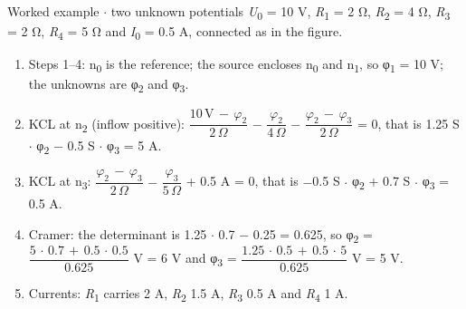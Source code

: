 \documentclass[11pt]{article}
\begin{document}
\begin{keepsection}
\begin{keepsection}
\begin{center}
\begin{minipage}[t]{0.950\linewidth}
\par{}\end{minipage}
\end{center}

\begin{workedbox}{Worked example \ensuremath{\cdot} two unknown potentials}
\textit{U}\textsubscript{0} = 10 V, \textit{R}\textsubscript{1} = 2 Ω, \textit{R}\textsubscript{2} = 4 Ω, \textit{R}\textsubscript{3} = 2 Ω, \textit{R}\textsubscript{4} = 5 Ω and \textit{I}\textsubscript{0} = 0.5 A, connected as in the figure.

\begin{enumerate}
\item Steps 1–4: n\textsubscript{0} is the reference; the source encloses n\textsubscript{0} and n\textsubscript{1}, so φ\textsubscript{1} = 10 V; the unknowns are φ\textsubscript{2} and φ\textsubscript{3}.
\item KCL at n\textsubscript{2} (inflow positive): {\small\ensuremath{\dfrac{10\, \mathrm{V}\, -\, φ_{2}}{2\, Ω}}} \ensuremath{-} {\small\ensuremath{\dfrac{φ_{2}}{4\, Ω}}} \ensuremath{-} {\small\ensuremath{\dfrac{φ_{2}\, -\, φ_{3}}{2\, Ω}}} = 0, that is 1.25 S \ensuremath{\cdot} φ\textsubscript{2} \ensuremath{-} 0.5 S \ensuremath{\cdot} φ\textsubscript{3} = 5 A.
\item KCL at n\textsubscript{3}: {\small\ensuremath{\dfrac{φ_{2}\, -\, φ_{3}}{2\, Ω}}} \ensuremath{-} {\small\ensuremath{\dfrac{φ_{3}}{5\, Ω}}} + 0.5 A = 0, that is \ensuremath{-}0.5 S \ensuremath{\cdot} φ\textsubscript{2} + 0.7 S \ensuremath{\cdot} φ\textsubscript{3} = 0.5 A.
\item Cramer: the determinant is 1.25 \ensuremath{\cdot} 0.7 \ensuremath{-} 0.25 = 0.625, so φ\textsubscript{2} = {\small\ensuremath{\dfrac{5\, \cdot \, 0.7\, +\, 0.5\, \cdot \, 0.5}{0.625}}} V = 6 V and φ\textsubscript{3} = {\small\ensuremath{\dfrac{1.25\, \cdot \, 0.5\, +\, 0.5\, \cdot \, 5}{0.625}}} V = 5 V.
\item Currents: \textit{R}\textsubscript{1} carries 2 A, \textit{R}\textsubscript{2} 1.5 A, \textit{R}\textsubscript{3} 0.5 A and \textit{R}\textsubscript{4} 1 A.
\end{enumerate}


\end{workedbox}
\end{keepsection}
\end{keepsection}
\end{document}
